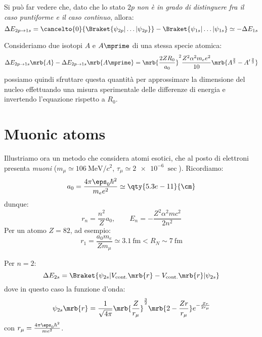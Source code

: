 Si può far vedere che, dato che lo stato $2p$ \textit{non è in grado di
	distinguere fra il caso puntiforme e il caso continuo}, allora:
\begin{equation}
	\Delta E _{2p \rightarrow 1s}
	= \cancelto{0}{\Braket{\psi _{2p} | \dots | \psi _{2p}}}
	- \Braket{\psi _{1s} | \dots | \psi _{1s}}
  \simeq
  - \Delta E _{1s}
\end{equation}

Consideriamo due isotopi $A$ e $A \mprime$ di una stessa specie atomica:
\begin{equation}
  \Delta E _{2p \rightarrow 1s} \mrb{A}
  - \Delta E _{2p \rightarrow 1s} \mrb{A \mprime}
  = \mrb{\frac{2 Z R_0}{a_0}}^{2} \frac{Z^2 \alpha^2 m_e e^2}{10} \mrb{A
  ^{\frac{2}{3}} - A^{\prime\, \frac{2}{3}}}
\end{equation}
possiamo quindi sfruttare questa quantità per approssimare la dimensione del
nucleo effettuando una misura sperimentale delle differenze di energia e
invertendo l'equazione rispetto a $R_0$.

\section{Muonic atoms}
Illustriamo ora un metodo che considera atomi esotici, che al posto di
elettroni presenta \textit{muoni} ($m_{\mu} \simeq \qty{106}{\MeV \per c^2}$,
$\tau _{\mu} \simeq \qty{2e-6}{\sec}$).
Ricordiamo:
\begin{equation}
  a_0 = \frac{4 \pi \eps_0 \hbar^2}{m_e e^2} \simeq \qty{5.3e-11}{\cm}
\end{equation}
dunque:
\begin{equation}
  r_n = \frac{n^2}{Z} a_0, \qquad E_n = -\frac{Z^2 \alpha^2 m c^2}{2n^2}
\end{equation}
Per un atomo $Z = 82$, ad esempio:
\begin{equation}
  r_1 = \frac{a_0 m_e}{Z m _{\mu}} \simeq \qty{3.1}{\femto\meter}
  < R_N \sim \qty{7}{\femto\meter}
\end{equation}

Per $n = 2$:
\begin{equation}
  \Delta E _{2s}
  = \Braket{\psi _{2s}
  | V _{\text{cont.}} \mrb{r} - V _{\text{cont.}} \mrb{r}
  | \psi _{2s}}
\end{equation}
dove in questo caso la funzione d'onda:
\begin{equation}
  \psi _{2s} \mrb{r}
  = \frac{1}{\sqrt{4 \pi}} \mrb{\frac{Z}{r _{\mu}}}^{\frac{3}{2}} \mrb{2 -
  \frac{Z r}{r _{\mu}}} e^{- \frac{Z r}{2 r _{\mu}}}
\end{equation}
con $r _{\mu} = \frac{4 \pi \eps_0 \hbar^2}{m e^2}$.

